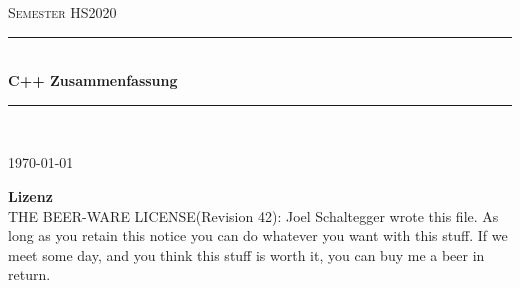 
\newcommand{\TITLE}{C++ Zusammenfassung}
\newcommand{\SUBJECT}{Semester HS2020}

\begin{titlepage}

\vspace*{\fill}

\newcommand{\HRule}{\color{black}\rule{\linewidth}{0.5mm}} %

\begin{center}

\vspace{0.5cm}

\textsc{\huge \SUBJECT}\\[1cm]

{\HRule} \\[0.7cm]
{ \Huge \bfseries \textcolor{OSTPink} {\TITLE}}\\[0.4cm]
{\HRule} \\[1.1cm]

\Large \AUTHOR

\Large \today


\end{center}

\vspace{10cm}

\textbf{Lizenz}\\
\dq THE BEER-WARE LICENSE\dq (Revision 42): Joel Schaltegger wrote this file. As long as you retain this notice you can do whatever you want with this stuff. If we meet some day, and you think this stuff is worth it, you can buy me a beer in return.



\vfill %

\end{titlepage}


\tableofcontents

